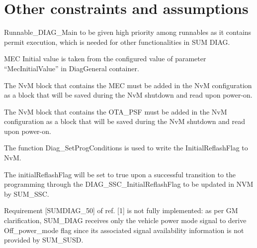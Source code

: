 \section{Other constraints and assumptions}
\label{sec:Other_constraints}
\begin{itemize}
\item Runnable_DIAG_Main to be given high priority among runnables as it contains permit execution, which is needed for other functionalities in SUM DIAG.



\item MEC Initial value is taken from the configured value of parameter “MecInitialValue” in DiagGeneral container.

\item The NvM block that contains the MEC must be added in the NvM configuration as a block that will be saved during the NvM shutdown and read upon power-on.

\item The NvM block that contains the OTA_PSF must be added in the NvM configuration as a block that will be saved during the NvM shutdown and read upon power-on.

\item The function Diag_SetProgConditions is used to write the InitialReflashFlag to NvM.

{
\item The initialReflashFlag will be set to true upon a successful transition to the programming through the DIAG_SSC_InitialReflashFlag to be updated in NVM by SUM_SSC.
}
{}

\item Requirement [SUMDIAG_50] of ref. [1] is not fully implemented: as per GM clarification, SUM_DIAG receives only the vehicle power mode signal to derive Off_power_mode flag since its associated signal availability information is not provided by SUM_SUSD.
\end{itemize}
